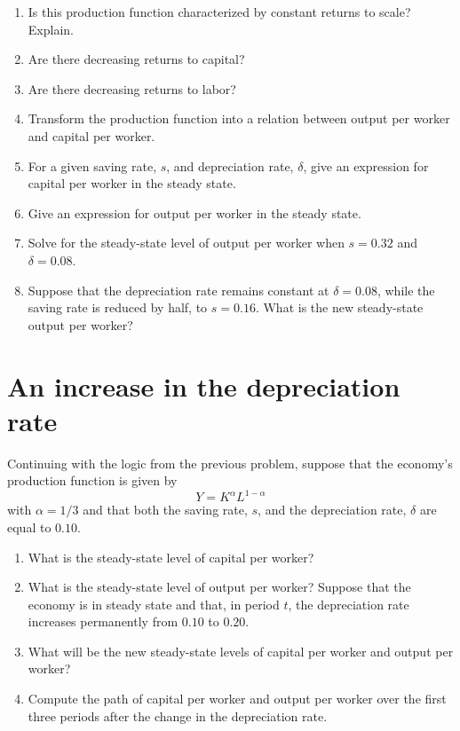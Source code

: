 \documentclass[]{book}
\theoremstyle{definition}
\theoremstyle{definition}
\theoremstyle{definition}
\theoremstyle{remark}
\begin{document}
\begin{enumerate}
\def\labelenumi{\arabic{enumi}.}
\item
  Is this production function characterized by constant returns to
  scale? Explain.
\item
  Are there decreasing returns to capital?
\item
  Are there decreasing returns to labor?
\item
  Transform the production function into a relation between output per
  worker and capital per worker.
\item
  For a given saving rate, \(s\), and depreciation rate, \(\delta\),
  give an expression for capital per worker in the steady state.
\item
  Give an expression for output per worker in the steady state.
\item
  Solve for the steady-state level of output per worker when \(s=0.32\)
  and \(\delta=0.08\).
\item
  Suppose that the depreciation rate remains constant at
  \(\delta=0.08\), while the saving rate is reduced by half, to
  \(s=0.16\). What is the new steady-state output per worker?
\end{enumerate}

\section{An increase in the depreciation
rate}\label{an-increase-in-the-depreciation-rate}

Continuing with the logic from the previous problem, suppose that the
economy's production function is given by \[Y=K^{\alpha}L^{1-\alpha}\]
with \(\alpha=1/3\) and that both the saving rate, \(s\), and the
depreciation rate, \(\delta\) are equal to \(0.10\).

\begin{enumerate}
\def\labelenumi{\arabic{enumi}.}
\item
  What is the steady-state level of capital per worker?
\item
  What is the steady-state level of output per worker? Suppose that the
  economy is in steady state and that, in period \(t\), the depreciation
  rate increases permanently from \(0.10\) to \(0.20\).
\item
  What will be the new steady-state levels of capital per worker and
  output per worker?
\item
  Compute the path of capital per worker and output per worker over the
  first three periods after the change in the depreciation rate.
\end{enumerate}
\end{document}
